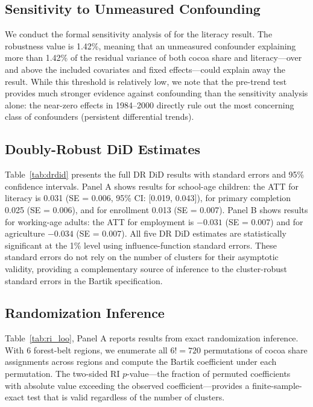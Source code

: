 \documentclass[12pt]{article}
\begin{document}
\subsection{Sensitivity to Unmeasured Confounding}

We conduct the formal sensitivity analysis of \citet{cinelli2020} for the literacy result. The robustness value is 1.42\%, meaning that an unmeasured confounder explaining more than 1.42\% of the residual variance of both cocoa share and literacy---over and above the included covariates and fixed effects---could explain away the result. While this threshold is relatively low, we note that the pre-trend test provides much stronger evidence against confounding than the sensitivity analysis alone: the near-zero effects in 1984--2000 directly rule out the most concerning class of confounders (persistent differential trends).

\subsection{Doubly-Robust DiD Estimates}



Table~\ref{tab:drdid} presents the full DR DiD results with standard errors and 95\% confidence intervals. Panel A shows results for school-age children: the ATT for literacy is 0.031 (SE = 0.006, 95\% CI: [0.019, 0.043]), for primary completion 0.025 (SE = 0.006), and for enrollment 0.013 (SE = 0.007). Panel B shows results for working-age adults: the ATT for employment is $-0.031$ (SE = 0.007) and for agriculture $-0.034$ (SE = 0.007). All five DR DiD estimates are statistically significant at the 1\% level using influence-function standard errors. These standard errors do not rely on the number of clusters for their asymptotic validity, providing a complementary source of inference to the cluster-robust standard errors in the Bartik specification.

\subsection{Randomization Inference}
\label{sec:ri}



Table~\ref{tab:ri_loo}, Panel A reports results from exact randomization inference. With 6 forest-belt regions, we enumerate all $6! = 720$ permutations of cocoa share assignments across regions and compute the Bartik coefficient under each permutation. The two-sided RI $p$-value---the fraction of permuted coefficients with absolute value exceeding the observed coefficient---provides a finite-sample-exact test that is valid regardless of the number of clusters.
\end{document}
